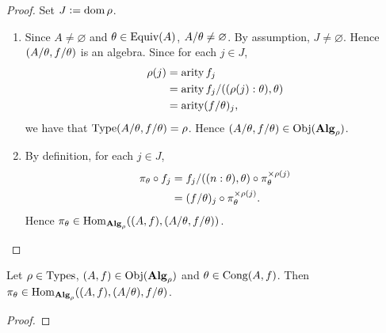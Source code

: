 \documentclass{book}
\begin{document}
\begin{proof}
	Set $J \vcentcolon= \operatorname{dom} \rho$.
	\begin{enumerate}
		\item Since $A \ne \varnothing$ and $\theta \in \operatorname*{\text{Equiv}}(A)$, $A/\theta \neq \varnothing$. By assumption, $J \neq \varnothing$. Hence $(A/\theta, f/\theta)$ is an algebra. Since for each $j \in J$,  
		\begin{align*}
			\rho(j)
			& = \operatorname*{\text{arity}} f_j \\
			& = \operatorname*{\text{arity}} f_j/((\rho(j):\theta), \theta) \\
			& = \operatorname*{\text{arity}} (f/\theta)_j,
		\end{align*}
		we have that $\operatorname{Type} (A/\theta, f/\theta) = \rho$. Hence $(A/\theta, f/\theta) \in \operatorname{Obj}(\operatorname*{\text{\textbf{Alg}}}_{\rho})$. 
		\item By definition, for each $j \in J$,
		\begin{align*}
			\pi_{\theta} \circ f_j
			& = f_j / ((n:\theta), \theta) \circ \pi_{\theta}^{\times \rho(j)} \\
			& = (f/\theta)_j \circ \pi_{\theta}^{\times \rho(j)}.
		\end{align*}
		Hence $\pi_{\theta} \in \operatorname{Hom}_{\operatorname*{\text{\textbf{Alg}}}_{\rho}}((A, f), (A/\theta, f/\theta))$.
	\end{enumerate}
\end{proof}

\begin{ex}
	Let $\rho \in \operatorname{Types}$, $(A, f) \in \operatorname{Obj}(\operatorname*{\text{\textbf{Alg}}}_\rho)$ and $\theta \in \operatorname*{\text{Cong}}(A, f)$. Then $\pi_{\theta} \in \operatorname{Hom}_{\operatorname*{\text{\textbf{Alg}}}_{\rho}}((A, f), (A/\theta), f/\theta)$.
\end{ex}

\begin{proof}
	
\end{proof}
\end{document}
